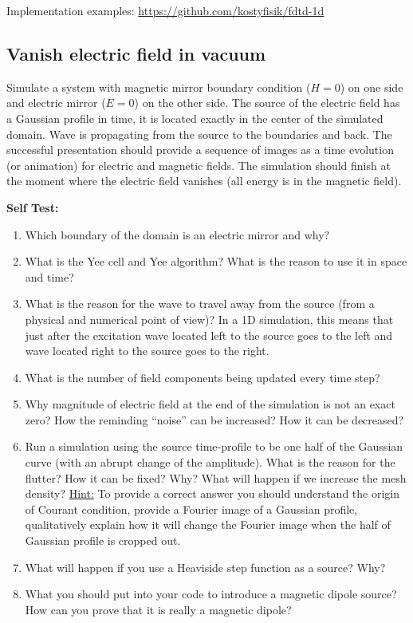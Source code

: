\documentclass[11pt]{article}
\begin{document}
  Implementation examples: \url{https://github.com/kostyfisik/fdtd-1d}
  

\subsection{Vanish electric field in vacuum\label{sec:vanish-e-field}}
Simulate a system with magnetic mirror boundary condition ($H=0$) on
one side and electric mirror ($E= 0$) on the other side. The source of
the electric field has a Gaussian profile in time, it is located exactly
in the center of the simulated domain. Wave is propagating from the
source to the boundaries and back. The successful presentation should
provide a sequence of images as a time evolution (or animation) for
electric and magnetic fields. The simulation should finish at the
moment where the electric field vanishes (all energy is in the
magnetic field).

\textbf{Self Test:}
\begin{enumerate}
\item  Which boundary of the domain is an electric mirror and why?
\item What is the Yee cell and Yee algorithm? What is the reason to use it in space and time?
\item What is the reason for the wave to travel away from the source
  (from a physical and numerical point of view)? In a 1D simulation, this
  means that just after the excitation wave located left to the source goes to
  the left and wave located right to the source goes to the
  right. 
\item What is the number of field components being updated every time step?  
\item Why magnitude of electric field at the end of
  the simulation is not an exact zero? How the reminding ``noise''
  can be increased? How it can be decreased?
\item Run a simulation using the source time-profile to be one half of
  the Gaussian curve (with an abrupt change of the amplitude). What is the reason for the flutter? How it can
  be fixed? Why? What will happen if we increase the mesh density? \underline{Hint:} To provide a correct answer you should
  understand the origin of Courant condition, provide a Fourier image
  of a Gaussian profile, qualitatively explain how it will change the
  Fourier image when the half of Gaussian profile is cropped out.
\item  What will happen if you use a Heaviside step function as a source? Why?
\item  What you should put into your code to introduce a
  magnetic dipole source? How can you prove that it is really a
  magnetic dipole?
\end{enumerate}
\end{document}
